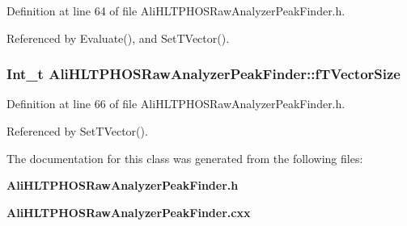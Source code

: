 Definition at line 64 of file Ali\-HLTPHOSRaw\-Analyzer\-Peak\-Finder.h.

Referenced by Evaluate(), and Set\-TVector().
\subsubsection{\setlength{\rightskip}{0pt plus 5cm}Int\_\-t {\bf Ali\-HLTPHOSRaw\-Analyzer\-Peak\-Finder::f\-TVector\-Size}\hspace{0.3cm}{\tt  [private]}}\label{classAliHLTPHOSRawAnalyzerPeakFinder_r2}




Definition at line 66 of file Ali\-HLTPHOSRaw\-Analyzer\-Peak\-Finder.h.

Referenced by Set\-TVector().

The documentation for this class was generated from the following files:\begin{CompactItemize}
\item 
{\bf Ali\-HLTPHOSRaw\-Analyzer\-Peak\-Finder.h}\item 
{\bf Ali\-HLTPHOSRaw\-Analyzer\-Peak\-Finder.cxx}\end{CompactItemize}
